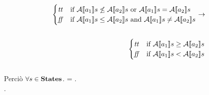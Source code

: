 {\begin{enumerate}[label=(\alph*)]
\begin{itemize}
\begin{align*}
      \begin{cases}
      \semtrue &
      \mbox{if} \ \A{a_1} \not \leq \A{a_2}
                  \mbox{ or }
                  \A{a_1} = \A{a_2} \\
      \semfalse &
      \mbox{if} \ \A{a_1} \leq \A{a_2}
                  \mbox{ and }
                  \A{a_1} \neq \A{a_2} \\
      \end{cases}
      \rightarrow \\ \\
      \begin{cases}
      \semtrue &
      \mbox{if} \ \A{a_1} \geq \A{a_2} \\
      \semfalse &
      \mbox{if} \ \A{a_1} < \A{a_2} \\
      \end{cases}
    \end{align*} \\
      Perciò $\forall s \in \states$. =
      . \\.


\end{itemize}
\end{enumerate}}
